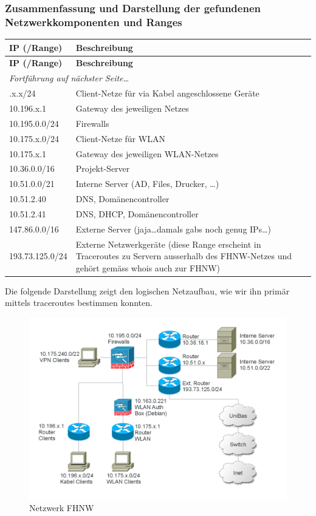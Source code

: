\documentclass[11pt,a4paper]{scrartcl}
\begin{document}
\subsubsection{Zusammenfassung und Darstellung der gefundenen Netzwerkkomponenten und Ranges}
\begin{longtable}{p{3cm}|p{9cm}}
	\textbf{IP (/Range)} & \textbf{Beschreibung} \\
	\hline
	\endfirsthead
	\textbf{IP (/Range)} & \textbf{Beschreibung} \\
	\hline
	\endhead
	\hline
	\multicolumn{2}{l}{\textit{Fortführung auf nächster Seite\ldots}} \\
	\endfoot
	\endlastfoot
	10.196.x.x/24	&	Client-Netze für via Kabel angeschlossene Geräte \\
	10.196.x.1		&	Gateway des jeweiligen Netzes \\
	10.195.0.0/24	&	Firewalls \\
	10.175.x.0/24	&	Client-Netze für WLAN \\
	10.175.x.1		&	Gateway des jeweiligen WLAN-Netzes \\
	10.36.0.0/16	&	Projekt-Server \\
	10.51.0.0/21	&	Interne Server (AD, Files, Drucker, \ldots) \\
	10.51.2.40		&	DNS, Domänencontroller \\
	10.51.2.41		&	DNS, DHCP, Domänencontroller \\
	147.86.0.0/16	&	Externe Server (jaja\ldots damals gabs noch genug IPs\ldots)\\
	193.73.125.0/24	&	Externe Netzwerkgeräte (diese Range erscheint in Traceroutes zu Servern ausserhalb des FHNW-Netzes und gehört gemäss whois auch zur FHNW)
\end{longtable}

Die folgende Darstellung zeigt den logischen Netzaufbau, wie wir ihn primär mittels traceroutes bestimmen konnten.
\begin{figure}[h]
	\centering
	\includegraphics[width=1.0\textwidth]{../aufg5/netzplan.png}
	\caption{Netzwerk FHNW}
	\label{fig:netzplan}
\end{figure}
\end{document}

